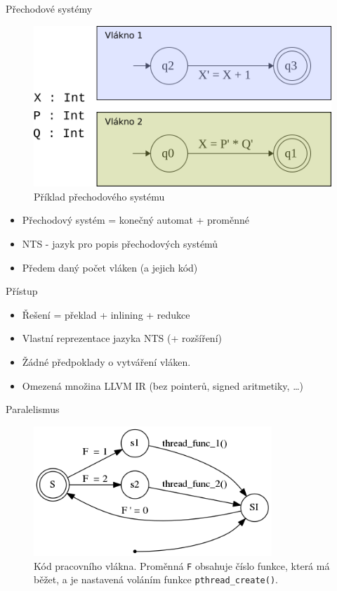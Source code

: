 \documentclass[11pt]{beamer}
\begin{document}
\begin{frame}{Přechodové systémy}
\begin{figure}
\includegraphics[scale=0.6]{transitionsystem.png}
\caption{Příklad přechodového systému}
\end{figure}
\begin{itemize}
\item Přechodový systém = konečný automat + proměnné
\item NTS - jazyk pro popis přechodových systémů
\item Předem daný počet vláken (a jejich kód)
\end{itemize}
\end{frame}



\begin{frame}{Přístup}
\begin{itemize}
\item Řešení = překlad + inlining + redukce
\item Vlastní reprezentace jazyka NTS (+ rozšíření)
\item Žádné předpoklady o vytváření vláken.
\item Omezená množina LLVM IR (bez pointerů, signed aritmetiky, \ldots)
\end{itemize}
\end{frame}

\begin{frame}{Paralelismus}
\begin{figure}
\includegraphics[width=0.8\textwidth]{paralelism.png}
\caption{Kód pracovního vlákna. Proměnná \texttt{F} obsahuje číslo funkce, která má běžet, a je nastavená voláním funkce \texttt{pthread\_create()}. }
\end{figure}
\end{frame}
\end{document}
